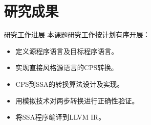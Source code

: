 
\section{研究成果}

\begin{frame}{研究工作进展}
    本课题研究工作按计划有序开展：
    \begin{itemize}
      \item 定义源程序语言及目标程序语言。
      \item 实现直接风格源语言的CPS转换。
      \item CPS到SSA的转换算法设计及实现。
      \item 用模拟技术对两步转换进行正确性验证。
      \item 将SSA程序编译到LLVM IR。
    \end{itemize}
  \end{frame}


